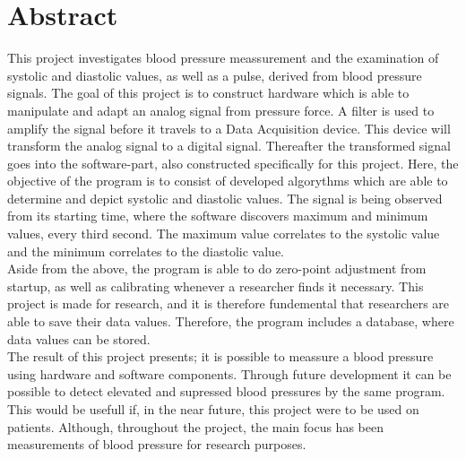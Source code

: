 \chapter{Abstract} 
This project investigates blood pressure meassurement and the examination of systolic and diastolic values, as well as a pulse, derived from blood pressure signals. The goal of this project is to construct hardware which is able to manipulate and adapt an analog signal from pressure force. A filter is used to amplify the signal before it travels to a Data Acquisition device. This device will transform the analog signal to a digital signal. Thereafter the transformed signal goes into the software-part, also constructed specifically for this project. Here, the objective of the program is to consist of developed algorythms which are able to determine and depict systolic and diastolic values. The signal is being observed from its starting time, where the software discovers maximum and minimum values, every third second. The maximum value correlates to the systolic value and the minimum correlates to the diastolic value.\\
Aside from the above, the program is able to do zero-point adjustment from startup, as well as calibrating whenever a researcher finds it necessary. This project is made for research, and it is therefore fundemental that researchers are able to save their data values. Therefore, the program includes a database, where data values can be stored.\\
The result of this project presents; it is possible to meassure a blood pressure using hardware and software components. Through future development it can be possible to detect elevated and supressed blood pressures by the same program. This would be usefull if, in the near future, this project were to be used on patients. Although, throughout the project, the main focus has been measurements of blood pressure for research purposes.
